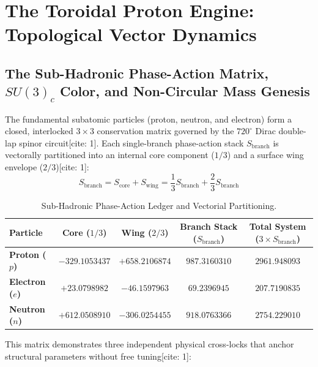 \documentclass[11pt,a4paper]{article}
\begin{document}
	\section{The Toroidal Proton Engine: Topological Vector Dynamics}
	\subsection{The Sub-Hadronic Phase-Action Matrix, $SU(3)_c$ Color, and Non-Circular Mass Genesis}
	
	The fundamental subatomic particles (proton, neutron, and electron) form a closed, interlocked $3 \times 3$ conservation matrix governed by the $720^\circ$ Dirac double-lap spinor circuit[cite: 1]. Each single-branch phase-action stack $S_{\text{branch}}$ is vectorally partitioned into an internal core component ($1/3$) and a surface wing envelope ($2/3$)[cite: 1]:
	\begin{equation}
		S_{\text{branch}} = S_{\text{core}} + S_{\text{wing}} = \frac{1}{3}S_{\text{branch}} + \frac{2}{3}S_{\text{branch}}
	\end{equation}
	
	\begin{table}[H]
		\centering
		\caption{Sub-Hadronic Phase-Action Ledger and Vectorial Partitioning.}
		\label{tab:action_matrix}
		\begin{tabular}{lcccc}
			\toprule
			\textbf{Particle} & \textbf{Core ($1/3$)} & \textbf{Wing ($2/3$)} & \textbf{Branch Stack ($S_{\text{branch}}$)} & \textbf{Total System ($3 \times S_{\text{branch}}$)} \\
			\midrule
			\textbf{Proton ($p$)}   & $-329.1053437$ & $+658.2106874$ & $987.3160310$ & $2961.948093$ \\
			\textbf{Electron ($e$)} & $+23.0798982$  & $-46.1597963$  & $69.2396945$  & $207.7190835$ \\
			\textbf{Neutron ($n$)}  & $+612.0508910$ & $-306.0254455$ & $918.0763366$ & $2754.229010$ \\
			\bottomrule
		\end{tabular}
	\end{table}
	
	This matrix demonstrates three independent physical cross-locks that anchor structural parameters without free tuning[cite: 1]:
	
\end{document}
